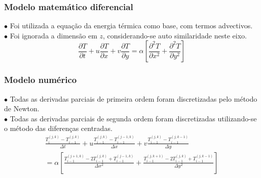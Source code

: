 \documentclass[xcolor=dvipsnames,10pt,aspectratio=169]{beamer}
\begin{document}
	
	\begin{frame} 
	\frametitle{Modelo matemático diferencial}
		$\bullet$ Foi utilizada a equação da energia térmica como base, com termos advectivos.\\
		$\bullet$ Foi ignorada a dimensão em $z$, considerando-se auto similaridade neste eixo.\\
		
	
	\begin{equation}
	\frac{\partial T}{\partial t} + u \frac{\partial T}{\partial x} + v \frac{\partial T}{\partial y} = \alpha \left[  \frac{\partial^2 T}{\partial x^2} + \frac{\partial^2 T}{\partial y^2}   \right] 
	\end{equation}
	
	\end{frame}




	\begin{frame} 
	\frametitle{Modelo numérico}
	$\bullet$ Todas as derivadas parciais de primeira ordem foram discretizadas pelo método de Newton.\\
	$\bullet$ Todas as derivadas parciais de segunda ordem foram discretizadas utilizando-se o método das diferenças centradas.\\
	
	
	\begin{equation}
	\begin{split}
	\frac{T_i^{(j,k)} - T_{i -1}^{(j,k)} }{\Delta t} + u \frac{T_{i -1}^{(j,k)} - T_{i -1}^{(j - 1,k)}}{\Delta x} + v \frac{T_{i -1}^{(j,k)} - T_{i -1}^{(j,k - 1)}}{\Delta y}  \\ 
	= \alpha \left[  \frac{T_{i -1}^{(j+1,k)} - 2 T_{i -1}^{(j,k)} + T_{i -1}^{(j - 1,k)} }{\Delta x^2} + \frac{T_{i -1}^{(j,k + 1)} - 2 T_{i -1}^{(j,k)} + T_{i -1}^{(j,k - 1)}}{\Delta y^2}   \right] 
	\end{split}
	\end{equation}
	
	\end{frame}
\end{document}
